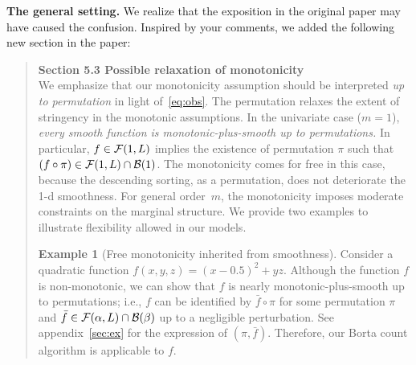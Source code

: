 \documentclass[11pt]{article}
\theoremstyle{plain}
\theoremstyle{definition}
\newtheorem{example}{Example}
\begin{document}
\begin{enumerate}[wide, labelwidth=!, labelindent=0pt]
    
 {\bf The general setting. } We realize that the exposition in the original paper may have caused the confusion. Inspired by your comments, we added the following new section in the paper: 
 
 \begin{quote}
{ \color{blue} {\bf Section 5.3 Possible relaxation of monotonicity}\\



We emphasize that our monotonicity assumption should be interpreted \emph{up to permutation} in light of~\eqref{eq:obs}. The permutation relaxes the extent of stringency in the monotonic assumptions. In the univariate case ($m=1$), \emph{every smooth function is monotonic-plus-smooth up to permutations.} In particular, $f\in \mathcal{F}(1, L)$ implies the existence of permutation $\pi$ such that $(f\circ \pi) \in \mathcal{F}(1, L)\cap \mathcal{B}(1)$. The monotonicity comes for free in this case, because the descending sorting, as a permutation, does not deteriorate the 1-d smoothness. For general order~$m$, the monotonicity imposes moderate constraints on the marginal structure. We provide two examples to illustrate flexibility allowed in our models.  \\
  
  
  \begin{example}[Free monotonicity inherited from smoothness]\label{ex:free}Consider a quadratic function $f(x,y,z)=(x-0.5)^2+yz$. Although the function $f$ is non-monotonic, we can show that $f$ is nearly monotonic-plus-smooth up to permutations; i.e., $f$ can be identified by $\bar f\circ \pi$ for some permutation $\pi$ and $\bar f \in \mathcal{F}(\alpha,L)\cap \mathcal{B}(\beta)$ up to a negligible perturbation. See appendix~\ref{sec:ex} for the expression of $(\pi, \bar f)$. Therefore, our Borta count algorithm is applicable to $f$.  
 \end{example}
 
}
\end{quote}
\end{enumerate}
\end{document}
